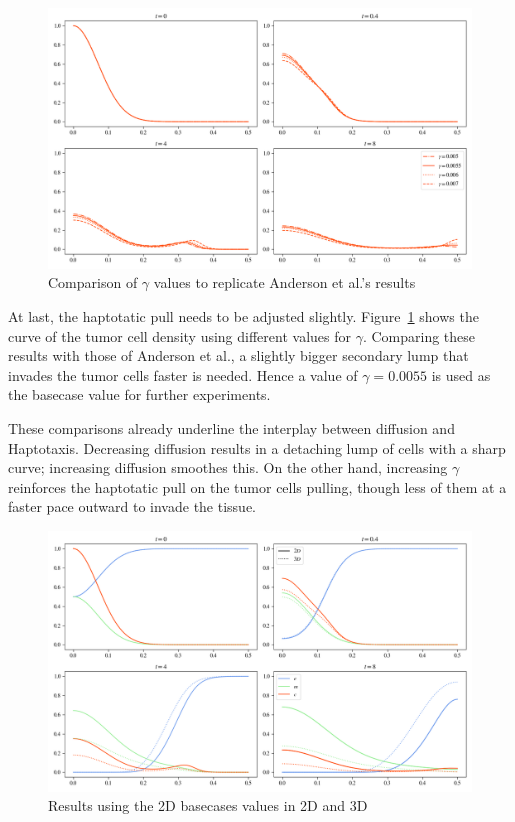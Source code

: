 \begin{figure}[!htb]
 \centering
 \includegraphics[width=\textwidth]{resources/images/gamma_comparison.png}
 \caption{Comparison of $\gamma$ values to replicate Anderson et al.'s results}
 \label{fig:replication_gamma_comparison}
\end{figure}

At last, the haptotatic pull needs to be adjusted slightly. Figure~\ref{fig:replication_gamma_comparison} shows the curve of the tumor cell density using different values for $\gamma$. Comparing these results with those of Anderson et al., a slightly bigger secondary lump that invades the tumor cells faster is needed. Hence a value of $\gamma=0.0055$ is used as the basecase value for further experiments.

These comparisons already underline the interplay between diffusion and Haptotaxis. Decreasing diffusion results in a detaching lump of cells with a sharp curve; increasing diffusion smoothes this. On the other hand, increasing $\gamma$ reinforces the haptotatic pull on the tumor cells pulling, though less of them at a faster pace outward to invade the tissue.

\begin{figure}[h!]
    \centering
    \includegraphics[width=\textwidth]{resources/images/2D_without_proliferation_replication_3D.png}
    \caption{Results using the 2D basecases values in 2D and 3D}
    \label{fig:2D_proliferation_replication_3D}
\end{figure}

